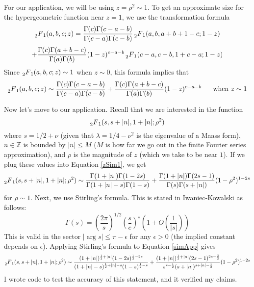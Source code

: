 \documentclass[]{article}
\begin{document}
For our application, we will be using $z = \rho^2 \sim 1$.
To get an approximate size for the hypergeometric function near $z = 1$, we use the transformation formula
$$
\prescript{}{2}{F}_1(a, b, c; z) =
\frac{\Gamma(c)\Gamma(c-a-b)}{\Gamma(c-a)\Gamma(c-b)}\prescript{}{2}{F}_1(a, b, a+b+1-c; 1-z) $$$$ + \frac{\Gamma(c)\Gamma(a+b-c)}{\Gamma(a)\Gamma(b)}(1-z)^{c-a-b}\prescript{}{2}{F}_1(c-a, c-b, 1+c-a; 1-z)
$$
Since $\prescript{}{2}{F}_1(a, b, c; z) \sim 1$ when $z \sim 0$, this formula implies that
\begin{equation}\label{zSim1}
\prescript{}{2}{F}_1(a, b, c; z) \sim
\frac{\Gamma(c)\Gamma(c-a-b)}{\Gamma(c-a)\Gamma(c-b)} +
\frac{\Gamma(c)\Gamma(a+b-c)}{\Gamma(a)\Gamma(b)}(1-z)^{c-a-b} ~~~~~\text{when}~ z \sim 1
\end{equation}

Now let's move to our application.
Recall that we are interested in the function
$$
\prescript{}{2}{F}_1(s, s + |n|, 1 + |n|; \rho^2)
$$
where $s = 1/2 + \nu$ (given that $\lambda = 1/4 - \nu^2$ is the eigenvalue of a Maass form), $n \in \mathbb{Z}$ is bounded by $|n| \leq M$ ($M$ is how far we go out in the finite Fourier series approximation), and $\rho$ is the magnitude of $z$ (which we take to be near $1$).
If we plug these values into Equation \ref{zSim1}, we get
\begin{equation}\label{simApp}
\prescript{}{2}{F}_1(s, s + |n|, 1 + |n|; \rho^2) \sim
\frac{\Gamma(1 + |n|)\Gamma(1 - 2s)}{\Gamma(1 + |n| - s)\Gamma(1 - s)} +
\frac{\Gamma(1 + |n|)\Gamma(2s-1)}{\Gamma(s)\Gamma(s + |n|)}(1 - \rho^2)^{1 - 2s}
\end{equation}
for $\rho \sim 1$.
Next, we use Stirling's formula.
This is stated in Iwaniec-Kowalski as follows:
$$
\Gamma(s) = \left( \frac{2\pi}{s} \right)^{1/2}\left( \frac{s}{e} \right)^s\left( 1 + O\left( \frac{1}{|s|}\right) \right)
$$
This is valid in the sector $|\arg s| \leq \pi - \epsilon$ for any $\epsilon > 0$ (the implied constant depends on $\epsilon$).
Applying Stirling's formula to Equation \ref{simApp} gives
\begin{equation}\label{approxResult}
\prescript{}{2}{F}_1(s, s + |n|, 1 + |n|; \rho^2) \sim
\frac{(1+|n|)^{\frac{1}{2}+|n|}(1-2s)^{\frac{1}{2}-2s}}{(1+|n|-s)^{\frac{1}{2}+|n|-s}(1-s)^{\frac{1}{2}-s}} +
\frac{(1+|n|)^{\frac{1}{2}+|n|}(2s-1)^{2s-\frac{3}{2}}}{s^{s-\frac{1}{2}}(s+|n|)^{s+|n|-\frac{1}{2}}}(1-\rho^2)^{1-2s}
\end{equation}
I wrote code to test the accuracy of this statement, and it verified my claims.
\\
\end{document}
